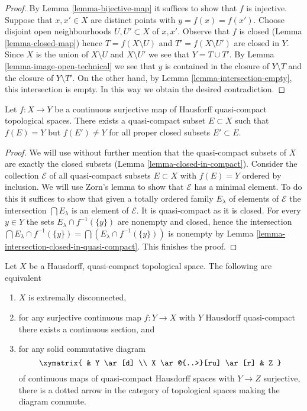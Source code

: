 \begin{proof}
By Lemma \ref{lemma-bijective-map} it suffices to show that $f$ is injective.
Suppose that $x, x' \in X$ are distinct points with $y = f(x) = f(x')$.
Choose disjoint open neighbourhoods $U, U' \subset X$ of $x, x'$.
Observe that $f$ is closed (Lemma \ref{lemma-closed-map}) hence
$T = f(X \setminus U)$ and $T' = f(X \setminus U')$ are closed in $Y$.
Since $X$ is the union of $X \setminus U$ and $X \setminus U'$ we see that
$Y = T \cup T'$. By Lemma \ref{lemma-image-open-technical} we
see that $y$ is contained in the closure of $Y \setminus T$ and
the closure of $Y \setminus T'$. On the other hand, by
Lemma \ref{lemma-intersection-empty},
this intersection is empty. In this way we obtain the desired contradiction.
\end{proof}

\begin{lemma}
\label{lemma-find-compact-subset}
Let $f : X \to Y$ be a continuous surjective map of Hausforff quasi-compact
topological spaces. There exists a quasi-compact subset $E \subset X$
such that $f(E) = Y$ but $f(E') \not = Y$ for all proper closed subsets
$E' \subset E$.
\end{lemma}

\begin{proof}
We will use without further mention that the quasi-compact subsets
of $X$ are exactly the closed subsets
(Lemma \ref{lemma-closed-in-compact}).
Consider the collection $\mathcal{E}$ of all quasi-compact subsets
$E \subset X$ with $f(E) = Y$ ordered by inclusion. We will use
Zorn's lemma to show that
$\mathcal{E}$ has a minimal element. To do this it suffices to show
that given a totally ordered family $E_\lambda$ of elements of $\mathcal{E}$
the intersection $\bigcap E_\lambda$ is an element of $\mathcal{E}$.
It is quasi-compact as it is closed.
For every $y \in Y$ the sets $E_\lambda \cap f^{-1}(\{y\})$
are nonempty and closed, hence the intersection
$\bigcap E_\lambda \cap f^{-1}(\{y\}) = \bigcap (E_\lambda \cap f^{-1}(\{y\}))$
is nonempty by
Lemma \ref{lemma-intersection-closed-in-quasi-compact}.
This finishes the proof.
\end{proof}

\begin{proposition}
\label{proposition-projective-in-category-hausdorff-qc}
Let $X$ be a Hausdorff, quasi-compact topological space.
The following are equivalent
\begin{enumerate}
\item $X$ is extremally disconnected,
\item for any surjective continuous map $f : Y \to X$ with $Y$ Hausdorff
quasi-compact there exists a continuous section, and
\item for any solid commutative diagram
$$
\xymatrix{
& Y \ar[d] \\
X \ar@{..>}[ru] \ar[r] & Z
}
$$
of continuous maps of quasi-compact Hausdorff spaces with $Y \to Z$
surjective, there is a dotted arrow
in the category of topological spaces making the diagram commute.
\end{enumerate}
\end{proposition}

